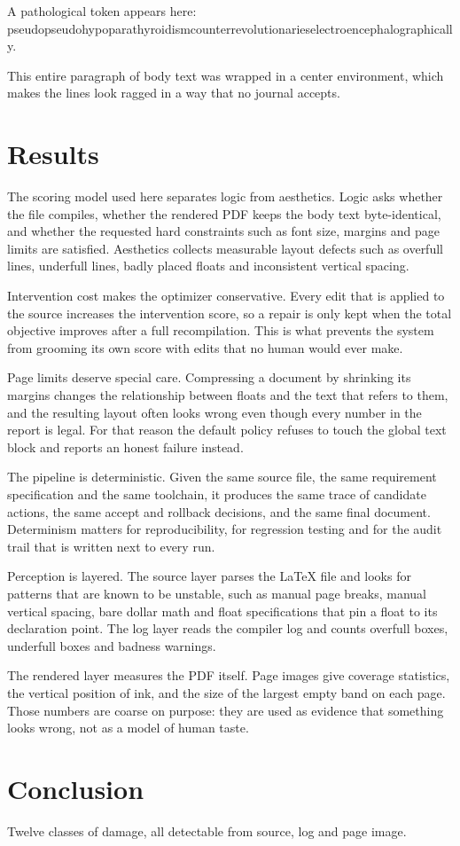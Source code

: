 \documentclass[10pt,a4paper]{article}
\begin{document}
A pathological token appears here: pseudopseudohypoparathyroidismcounterrevolutionarieselectroencephalographically.

\begin{center}
This entire paragraph of body text was wrapped in a center environment, which
makes the lines look ragged in a way that no journal accepts.
\end{center}

\clearpage


\section{Results}
The scoring model used here separates logic from aesthetics. Logic asks whether the file compiles, whether the rendered PDF keeps the body text byte-identical, and whether the requested hard constraints such as font size, margins and page limits are satisfied. Aesthetics collects measurable layout defects such as overfull lines, underfull lines, badly placed floats and inconsistent vertical spacing.

Intervention cost makes the optimizer conservative. Every edit that is applied to the source increases the intervention score, so a repair is only kept when the total objective improves after a full recompilation. This is what prevents the system from grooming its own score with edits that no human would ever make.

Page limits deserve special care. Compressing a document by shrinking its margins changes the relationship between floats and the text that refers to them, and the resulting layout often looks wrong even though every number in the report is legal. For that reason the default policy refuses to touch the global text block and reports an honest failure instead.

The pipeline is deterministic. Given the same source file, the same requirement specification and the same toolchain, it produces the same trace of candidate actions, the same accept and rollback decisions, and the same final document. Determinism matters for reproducibility, for regression testing and for the audit trail that is written next to every run.

Perception is layered. The source layer parses the LaTeX file and looks for patterns that are known to be unstable, such as manual page breaks, manual vertical spacing, bare dollar math and float specifications that pin a float to its declaration point. The log layer reads the compiler log and counts overfull boxes, underfull boxes and badness warnings.

The rendered layer measures the PDF itself. Page images give coverage statistics, the vertical position of ink, and the size of the largest empty band on each page. Those numbers are coarse on purpose: they are used as evidence that something looks wrong, not as a model of human taste.


\section{Conclusion}
Twelve classes of damage, all detectable from source, log and page image.
\end{document}
